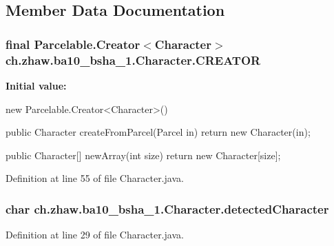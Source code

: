 \subsection{Member Data Documentation}
\hypertarget{classch_1_1zhaw_1_1ba10__bsha__1_1_1Character_a0659f648118f65f0deed3ac7b08bdee1}{
\subsubsection[{CREATOR}]{\setlength{\rightskip}{0pt plus 5cm}final Parcelable.Creator$<${\bf Character}$>$ {\bf ch.zhaw.ba10\_\-bsha\_\-1.Character.CREATOR}}}
\label{classch_1_1zhaw_1_1ba10__bsha__1_1_1Character_a0659f648118f65f0deed3ac7b08bdee1}
{\bfseries Initial value:}
\begin{DoxyCode}
 new Parcelable.Creator<Character>() {
                public Character createFromParcel(Parcel in) {
                        return new Character(in);
                }

                public Character[] newArray(int size) {
                        return new Character[size];
                }
        }
\end{DoxyCode}


Definition at line 55 of file Character.java.\hypertarget{classch_1_1zhaw_1_1ba10__bsha__1_1_1Character_ab26dadf317157ee393e6498b03c4c4b2}{
\subsubsection[{detectedCharacter}]{\setlength{\rightskip}{0pt plus 5cm}char {\bf ch.zhaw.ba10\_\-bsha\_\-1.Character.detectedCharacter}}}
\label{classch_1_1zhaw_1_1ba10__bsha__1_1_1Character_ab26dadf317157ee393e6498b03c4c4b2}


Definition at line 29 of file Character.java.

